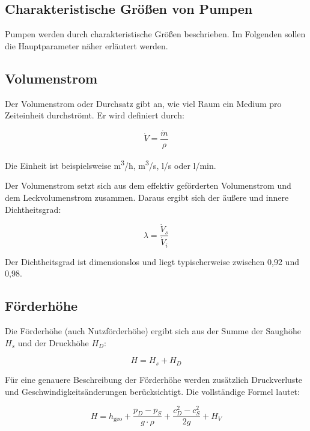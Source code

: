\subsection*{Charakteristische Größen von Pumpen}

Pumpen werden durch charakteristische Größen beschrieben. Im Folgenden sollen die Hauptparameter näher erläutert werden.

\subsection*{Volumenstrom}

Der Volumenstrom oder Durchsatz gibt an, wie viel Raum ein Medium pro Zeiteinheit durchströmt. Er wird definiert durch:

\begin{equation}
	\dot{V} = \frac{\dot{m}}{\rho}
\end{equation}

Die Einheit ist beispielsweise \si{m^3/h}, \si{m^3/s}, \si{l/s} oder \si{l/min}.

Der Volumenstrom setzt sich aus dem effektiv geförderten Volumenstrom und dem Leckvolumenstrom zusammen. Daraus ergibt sich der äußere und innere Dichtheitsgrad:

\begin{equation}
	\lambda = \frac{\dot{V}_s}{\dot{V}_i}
\end{equation}

Der Dichtheitsgrad ist dimensionslos und liegt typischerweise zwischen 0{,}92 und 0{,}98.

\subsection*{Förderhöhe}

Die Förderhöhe (auch Nutzförderhöhe) ergibt sich aus der Summe der Saughöhe \( H_s \) und der Druckhöhe \( H_D \):

\begin{equation}
	H = H_s + H_D
\end{equation}

Für eine genauere Beschreibung der Förderhöhe werden zusätzlich Druckverluste und Geschwindigkeitsänderungen berücksichtigt. Die vollständige Formel lautet:

\begin{equation}
	H = h_{\text{geo}} + \frac{p_D - p_S}{g \cdot \rho} + \frac{c_D^2 - c_S^2}{2g} + H_V
\end{equation}

